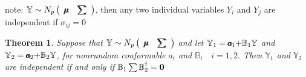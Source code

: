 \documentclass{article}
\newtheorem{theorem}{Theorem}
\begin{document}
\bigskip

note: $\mathbb{Y}\sim N_{p}\left( 
\begin{array}{cc}
\mathbb{%
\mu\mkern-12.3mu\mu%
} & \mathbb{%
\tsum\mkern-20mu\tsum%
}%
\end{array}%
\right) $, then any two individual variables $Y_{i}$ and $Y_{j}$ are
independent if $\sigma _{ij}=0$

\bigskip

\begin{theorem}
Suppose that $\mathbb{Y}\sim N_{p}\left( 
\begin{array}{cc}
\mathbb{%
\mu\mkern-12.3mu\mu%
} & \mathbb{%
\tsum\mkern-20mu\tsum%
}%
\end{array}%
\right) $ and let $\mathbb{Y}_{1}=%
a\mkern-11mu a%
_{1}\mathbb{+B}_{1}\mathbb{Y}$ and $\mathbb{Y}_{2}=%
a\mkern-11mu a%
_{2}\mathbb{+B}_{2}\mathbb{Y}$, for nonrundom conformable $a_{i}$ and $%
\mathbb{B}_{i}\quad i=1,2.$ Then $\mathbb{Y}_{1}$ and $\mathbb{Y}_{2}$ are
independent if and only if $\mathbb{B}_{1}\tsum \mathbb{B}_{2}^{\dagger }=%
\boldsymbol{0}$


\end{theorem}
\end{document}
